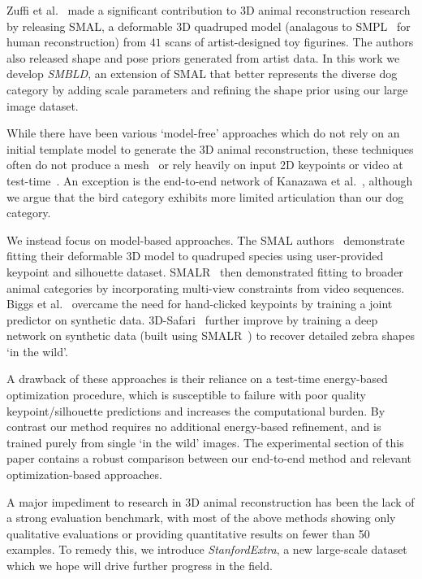   Zuffi et al.~\cite{DBLP:journals/corr/ZuffiKJB16} made a significant contribution to 3D animal reconstruction research by releasing SMAL, a deformable 3D quadruped model (analagous to SMPL~\cite{loper2015smpl} for human reconstruction) from $41$ scans of artist-designed toy figurines. The authors also released shape and pose priors generated from artist data. In this work we develop \emph{SMBLD}, an extension of SMAL that better represents the diverse dog category by adding scale parameters and refining the shape prior using our large image dataset.
  
  While there have been various `model-free' approaches which do not rely on an initial template model to generate the 3D animal reconstruction, these techniques often do not produce a mesh~\cite{Agudo_2018_CVPR,novotny19c3dpo} or rely heavily on input 2D keypoints or video at test-time~\cite{vicente_3dv,Probst2018_ECCVa}. An exception is the end-to-end network of Kanazawa et al.~\cite{kanazawa2018birds}, although we argue that the bird category exhibits more limited articulation than our dog category.
  
  We instead focus on model-based approaches. The SMAL authors~\cite{DBLP:journals/corr/ZuffiKJB16} demonstrate fitting their deformable 3D model to quadruped species using user-provided keypoint and silhouette dataset. SMALR~\cite{Zuffi:CVPR:2018} then demonstrated fitting to broader animal categories by incorporating multi-view constraints from video sequences. Biggs et al.~\cite{biggs2018creatures} overcame the need for hand-clicked keypoints by training a joint predictor on synthetic data. 3D-Safari~\cite{Zuffi19Safari} further improve by training a deep network on synthetic data (built using SMALR~\cite{Zuffi:CVPR:2018}) to recover detailed zebra shapes `in the wild'.
  
  A drawback of these approaches is their reliance on a test-time energy-based optimization procedure, which is susceptible to failure with poor quality keypoint/silhouette predictions and increases the computational burden. By contrast our method requires no additional energy-based refinement, and is trained purely from single `in the wild' images. The experimental section of this paper contains a robust comparison between our end-to-end method and relevant optimization-based approaches. 
  
  A major impediment to research in 3D animal reconstruction has been the lack of a strong evaluation benchmark, with most of the above methods showing only qualitative evaluations or providing quantitative results on fewer than 50 examples. To remedy this, we introduce \emph{StanfordExtra}, a new large-scale dataset which we hope will drive further progress in the field. 
  
